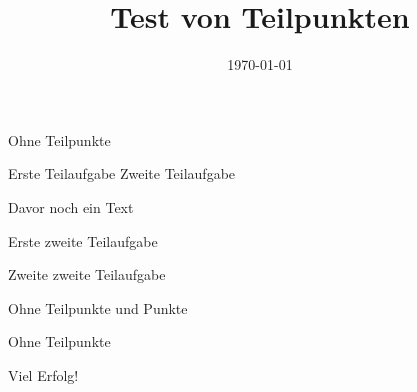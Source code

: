 \documentclass[a4paper]{scrartcl}
\date{\today}
\title{Test von Teilpunkten}
\begin{document}
    \begin{aufgabe}[subtitle=Erste ohne Teilpunkte,points=34]
        Ohne Teilpunkte
    \end{aufgabe}

    \begin{aufgabe}[subtitle=Erste Aufgabe mit Teilpunkten]
        \begin{teilaufgaben}
            \teilaufgabe[4] Erste Teilaufgabe
            \teilaufgabe[6] Zweite Teilaufgabe
        \end{teilaufgaben}
    \end{aufgabe}

    \begin{aufgabe}[subtitle=Zweite mit Teilpunkten]
        Davor noch ein Text
        \begin{teilaufgaben}
            \teilaufgabe[10] Erste zweite Teilaufgabe

            \teilaufgabe[10] Zweite zweite Teilaufgabe
        \end{teilaufgaben}
    \end{aufgabe}

    \begin{aufgabe}[subtitle=Ohne Punkte]
        Ohne Teilpunkte und Punkte
    \end{aufgabe}

    \begin{aufgabe}[subtitle=Ohne Teilpunkte,points=23]
        Ohne Teilpunkte
    \end{aufgabe}

\vspace{1cm}

{\Huge Viel Erfolg!}

\vspace{1cm}

\punktuebersicht
\end{document}
